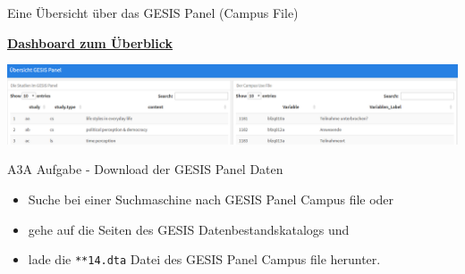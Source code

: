 \documentclass[ignorenonframetext,]{beamer}
\providecommand{\tightlist}{%
  \setlength{\itemsep}{0pt}\setlength{\parskip}{0pt}}
\begin{document}
\begin{frame}{Eine Übersicht über das GESIS Panel (Campus File)}

\begin{block}{\href{http://rpubs.com/Japhilko82/overview_gp}{\textbf{Dashboard
zum Überblick}}}

\includegraphics{figure/Dashboard_gesispanel.PNG}

\end{block}

\end{frame}

\begin{frame}[fragile]{A3A Aufgabe - Download der GESIS Panel Daten}

\begin{itemize}
\tightlist
\item
  Suche bei einer Suchmaschine nach GESIS Panel Campus file oder
\item
  gehe auf die Seiten des GESIS Datenbestandskatalogs und
\item
  lade die \texttt{**14.dta} Datei des GESIS Panel Campus file herunter.
\end{itemize}

\end{frame}
\end{document}
